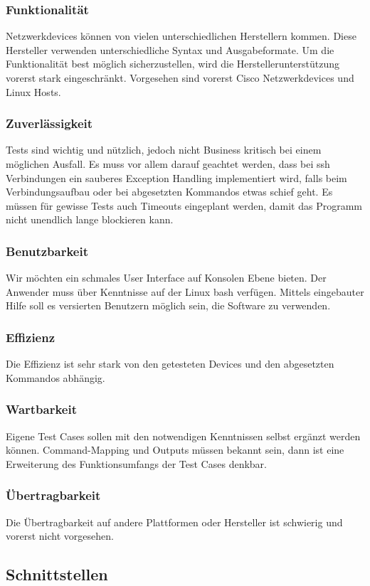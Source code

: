 \subsubsection{Funktionalität}
Netzwerkdevices können von vielen unterschiedlichen Herstellern kommen. Diese Hersteller verwenden unterschiedliche Syntax und Ausgabeformate. Um die Funktionalität best möglich sicherzustellen, wird die Herstellerunterstützung vorerst stark eingeschränkt. Vorgesehen sind vorerst Cisco Netzwerkdevices und Linux Hosts.
\subsubsection{Zuverlässigkeit}
Tests sind wichtig und nützlich, jedoch nicht Business kritisch bei einem möglichen Ausfall. Es muss vor allem darauf geachtet werden, dass bei ssh Verbindungen ein sauberes Exception Handling implementiert wird, falls beim Verbindungsaufbau oder bei abgesetzten Kommandos etwas schief geht. Es müssen für gewisse Tests auch Timeouts eingeplant werden, damit das Programm nicht unendlich lange blockieren kann.
\subsubsection{Benutzbarkeit}
Wir möchten ein schmales User Interface auf Konsolen Ebene bieten. Der Anwender muss über Kenntnisse auf der Linux bash verfügen. Mittels eingebauter Hilfe soll es versierten Benutzern möglich sein, die Software zu verwenden.
\subsubsection{Effizienz}
Die Effizienz ist sehr stark von den getesteten Devices und den abgesetzten Kommandos abhängig. 
\subsubsection{Wartbarkeit}
Eigene Test Cases sollen mit den notwendigen Kenntnissen selbst ergänzt werden können. Command-Mapping und Outputs müssen bekannt sein, dann ist eine Erweiterung des Funktionsumfangs der Test Cases denkbar.
\subsubsection{Übertragbarkeit}
Die Übertragbarkeit auf andere Plattformen oder Hersteller ist schwierig und vorerst nicht vorgesehen.

\subsection{Schnittstellen}

